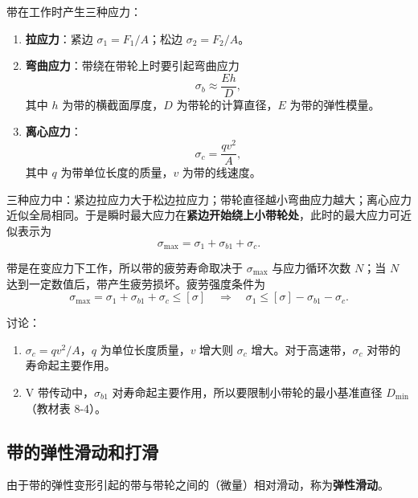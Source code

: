 带在工作时产生三种应力：
\begin{enumerate}
	\item \textbf{拉应力}：紧边 $\sigma_1=F_1/A$；松边 $\sigma_2=F_2/A$。
	\item \textbf{弯曲应力}：带绕在带轮上时要引起弯曲应力
	      \begin{equation}
		      \sigma_b\approx\frac{Eh}{D},
		      \label{eq:带传动:弯曲应力}
	      \end{equation}
	      其中 $h$ 为带的横截面厚度，$D$ 为带轮的计算直径，$E$ 为带的弹性模量。
	\item \textbf{离心应力}：
	      \begin{equation}
		      \sigma_c=\frac{qv^2}{A},
		      \label{eq:带传动:离心应力}
	      \end{equation}
	      其中 $q$ 为带单位长度的质量，$v$ 为带的线速度。
\end{enumerate}

三种应力中：紧边拉应力大于松边拉应力；带轮直径越小弯曲应力越大；离心应力近似全局相同。于是瞬时最大应力在\textbf{紧边开始绕上小带轮处}，此时的最大应力可近似表示为
\begin{equation}
	\sigma_{\max}=\sigma_1+\sigma_{b1}+\sigma_c.
	\label{eq:带传动:最大应力}
\end{equation}

带是在变应力下工作，所以带的疲劳寿命取决于 $\sigma_{\max}$ 与应力循环次数 $N$；当 $N$ 达到一定数值后，带产生疲劳损坏。疲劳强度条件为
\begin{equation}
	\sigma_{\max}=\sigma_1+\sigma_{b1}+\sigma_c\le[\sigma]
	\quad\Rightarrow\quad
	\sigma_1\le[\sigma]-\sigma_{b1}-\sigma_c.
	\label{eq:带传动:疲劳强度条件}
\end{equation}

讨论：
\begin{enumerate}
	\item $\sigma_c=qv^2/A$，$q$ 为单位长度质量，$v$ 增大则 $\sigma_c$ 增大。对于高速带，$\sigma_c$ 对带的寿命起主要作用。
	\item V 带传动中，$\sigma_{b1}$ 对寿命起主要作用，所以要限制小带轮的最小基准直径 $D_{\min}$（教材表 8-4）。
\end{enumerate}

\subsection{带的弹性滑动和打滑}
\label{sec:带传动:弹性滑动和打滑}

\begin{definition}[弹性滑动]
	由于带的弹性变形引起的带与带轮之间的（微量）相对滑动，称为\textbf{弹性滑动}。
\end{definition}

